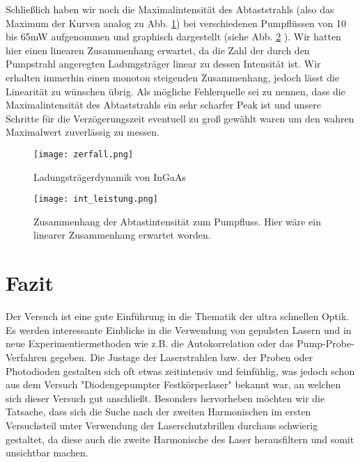 Schließlich haben wir noch die Maximalintensität des Abtaststrahls (also das Maximum der Kurven analog zu Abb. \ref{zerfall}) bei verschiedenen Pumpflüssen von 10 bis 65mW aufgenommen und graphisch dargestellt (siehe Abb. \ref{int_leistung} ). Wir hatten hier einen linearen Zusammenhang erwartet, da die Zahl der durch den Pumpstrahl angeregten Ladungsträger linear zu dessen Intensität ist. Wir erhalten immerhin einen monoton steigenden Zusammenhang, jedoch lässt die Linearität zu wünschen übrig. Als mögliche Fehlerquelle sei zu nennen, dass die Maximalintensität des Abtaststrahls ein sehr scharfer Peak ist und unsere Schritte für die Verzögerungszeit eventuell zu groß gewählt waren um den wahren Maximalwert zuverlässig zu messen.

\begin{figure}[h]
	\begin{center}
		\texttt{[image: zerfall.png]}
		\caption{Ladungsträgerdynamik von InGaAs}
		\label{zerfall}
	\end{center}
\end{figure}

\begin{figure}[h]
	\begin{center}
		\texttt{[image: int\_leistung.png]}
		\caption{Zusammenhang der Abtastintensität zum Pumpfluss. Hier wäre ein linearer Zusammenhang erwartet worden.}
		\label{int_leistung}
	\end{center}
\end{figure}


\section{Fazit}
Der Versuch ist eine gute Einführung in die Thematik der ultra schnellen Optik. Es werden interessante Einblicke in die Verwendung von gepulsten Lasern und in neue Experimentiermethoden wie z.B. die Autokorrelation oder das Pump-Probe-Verfahren gegeben. Die Justage der Laserstrahlen bzw. der Proben oder Photodioden gestalten sich oft etwas zeitintensiv und feinfühlig, was jedoch schon aus dem Versuch "Diodengepumpter Festkörperlaser"{} bekannt war, an welchen sich dieser Versuch gut anschließt. Besonders hervorheben möchten wir die Tatsache, dass sich die Suche nach der zweiten Harmonischen im ersten Versuchsteil unter Verwendung der Laserschutzbrillen durchaus schwierig gestaltet, da diese auch die zweite Harmonische des Laser herausfiltern und somit unsichtbar machen. 
	

